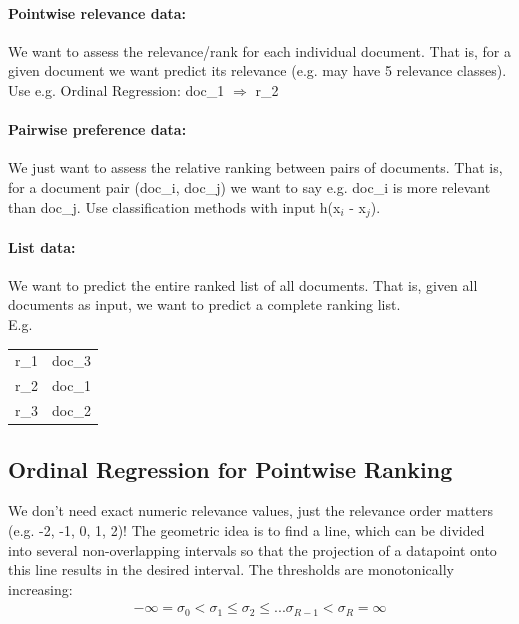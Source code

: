 \documentclass[a4paper,11pt]{article}
\begin{document}
\begin{multicols}{2}
\paragraph{Pointwise relevance data:} We want to assess the relevance/rank for each individual document. That is, for a given document we want predict its relevance (e.g. may have 5 relevance classes). Use e.g. Ordinal Regression: doc\_1 $\Rightarrow$ r\_2

\paragraph{Pairwise preference data:} We just want to assess the relative ranking between pairs of documents. That is, for a document pair (doc\_i, doc\_j) we want to say e.g. doc\_i is more relevant than doc\_j. Use classification methods with input h(x$_i$ - x$_j$).

\paragraph{List data:} We want to predict the entire ranked list of all documents. That is, given all documents as input, we want to predict a complete ranking list. \\
E.g. 
\begin{tabular}{l|c}
\hline
r\_1  &  doc\_3  \\
r\_2 &  doc\_1   \\
r\_3 & doc\_2 \\
\end{tabular}

\subsection{Ordinal Regression for Pointwise Ranking} We don't need exact numeric relevance values, just the relevance order matters (e.g. -2, -1, 0, 1, 2)! The geometric idea is to find a line, which can be divided into several non-overlapping intervals so that the projection of a datapoint onto this line results in the desired interval. The thresholds are monotonically increasing:
\begin{align*}
  - \infty = \sigma_0 < \sigma_1 \leq \sigma_2 \leq ... \sigma_{R-1} < \sigma_R = \infty
\end{align*}


\end{multicols}
\end{document}
